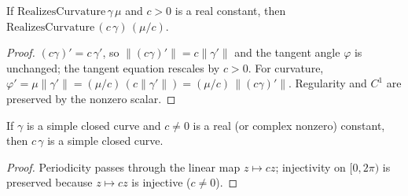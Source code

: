 \begin{lemma}


  \label{lem:realizes_curvature_smul}
  If $\mathrm{RealizesCurvature}\,\gamma\,\mu$ and $c>0$ is a real constant, then
  $\mathrm{RealizesCurvature}\,(c\,\gamma)\,(\mu/c)$.
\end{lemma}
\begin{proof}
  \leanok
  $(c\gamma)'=c\,\gamma'$, so $\lVert(c\gamma)'\rVert=c\lVert\gamma'\rVert$ and the
  tangent angle $\varphi$ is unchanged; the tangent equation rescales by $c>0$.
  For curvature, $\varphi'=\mu\lVert\gamma'\rVert=(\mu/c)\,(c\lVert\gamma'\rVert)
  =(\mu/c)\,\lVert(c\gamma)'\rVert$. Regularity and $C^1$ are preserved by the
  nonzero scalar.
\end{proof}

\begin{lemma}


  \label{lem:issimpleclosed_smul}
  If $\gamma$ is a simple closed curve and $c\neq 0$ is a real (or complex
  nonzero) constant, then $c\,\gamma$ is a simple closed curve.
\end{lemma}
\begin{proof}
  \leanok
  Periodicity passes through the linear map $z\mapsto cz$; injectivity on
  $[0,2\pi)$ is preserved because $z\mapsto cz$ is injective ($c\neq 0$).
\end{proof}

